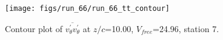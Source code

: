 \begin{figure}[H]
\centering
\texttt{[image: figs/run\_66/run\_66\_tt\_contour]}
\caption{Contour plot of $\overline{v_{\theta}^{\prime} v_{\theta}^{\prime}}$ at $z/c$=10.00, $V_{free}$=24.96, station 7.}
\label{fig:run_66_tt_contour}
\end{figure}


